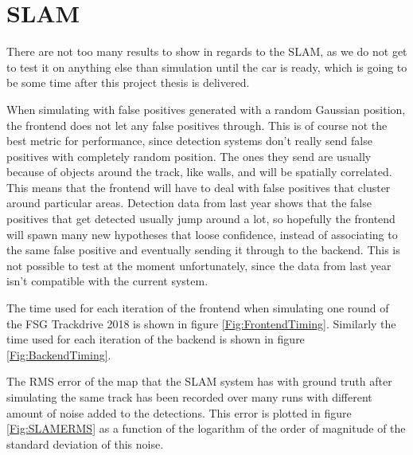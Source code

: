 \section{SLAM}

There are not too many results to show in regards to the SLAM, as we do not get to test it on anything else than simulation until the car is ready, which is going to be some time after this project thesis is delivered. 

When simulating with false positives generated with a random Gaussian position, the frontend does not let any false positives through. This is of course not the best metric for performance, since detection systems don't really send false positives with completely random position. The ones they send are usually because of objects around the track, like walls, and will be spatially correlated. This means that the frontend will have to deal with false positives that cluster around particular areas. Detection data from last year shows that the false positives that get detected usually jump around a lot, so hopefully the frontend will spawn many new hypotheses that loose confidence, instead of associating to the same false positive and eventually sending it through to the backend. This is not possible to test at the moment unfortunately, since the data from last year isn't compatible with the current system. 

The time used for each iteration of the frontend when simulating one round of the \gls{FSG} Trackdrive 2018 is shown in figure \ref{Fig:FrontendTiming}. Similarly the time used for each iteration of the backend is shown in figure \ref{Fig:BackendTiming}. 

The \gls{RMS} error of the map that the \gls{SLAM} system has with ground truth after simulating the same track has been recorded over many runs with different amount of noise added to the detections. This error is plotted in figure \ref{Fig:SLAMERMS} as a function of the logarithm of the order of magnitude of the standard deviation of this noise.

